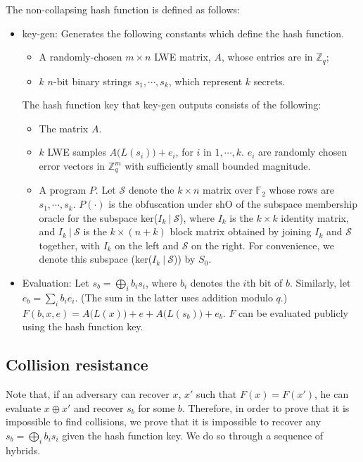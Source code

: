\documentclass{article}
\begin{document}
The non-collapsing hash function is defined as follows:
\begin{itemize}
    \item \textsf{key-gen}: Generates the following constants which define the hash function.
    \begin{itemize}
        \item A randomly-chosen $m \times n$ LWE matrix, $A$, whose entries are in $\mathbb{Z}_q$;
        \item $k$ $n$-bit binary strings $s_1, \cdots, s_k$, which represent $k$ secrets.
    \end{itemize}
    The hash function key that \textsf{key-gen} outputs consists of the following:
    \begin{itemize}
			\item The matrix $A$.
			\item $k$ LWE samples $A\big( L(s_i) \big) + e_i$, for $i$ in $1, \cdots, k$. $e_i$ are randomly chosen error vectors in $\mathbb{Z}_q^m$ with sufficiently small bounded magnitude.
        \item A program $P$. Let $\mathcal{S}$ denote the $k \times n$ matrix over $\mathbb{F}_2$ whose rows are $s_1, \cdots, s_k$. $P(\cdot)$ is the obfuscation under \textsf{shO} of the subspace membership oracle for the subspace ker($I_k \: | \: \mathcal{S}$), where $I_k$ is the $k \times k$ identity matrix, and $I_k \: | \: \mathcal{S}$ is the $k \times (n+k)$ block matrix obtained by joining $I_k$ and $\mathcal{S}$ together, with $I_k$ on the left and $\mathcal{S}$ on the right. For convenience, we denote this subspace (ker($I_k \: | \: \mathcal{S}$)) by $S_0$.
    \end{itemize}
    \item Evaluation: Let $s_b = \bigoplus_i b_i s_i$, where $b_i$ denotes the $i$th bit of $b$. Similarly, let $e_b = \sum_i b_i e_i$. (The sum in the latter uses addition modulo $q$.) $F(b, x, e) = A\big( L(x) \big) + e + A\big( L(s_b) \big) + e_b$. $F$ can be evaluated publicly using the hash function key.
\end{itemize}

\subsection{Collision resistance}
Note that, if an adversary can recover $x$, $x'$ such that $F(x) = F(x')$, he can evaluate $x \oplus x'$ and recover $s_b$ for some $b$. Therefore, in order to prove that it is impossible to find collisions, we prove that it is impossible to recover any $s_b = \bigoplus_i b_is_i$ given the hash function key. We do so through a sequence of hybrids.
\end{document}
